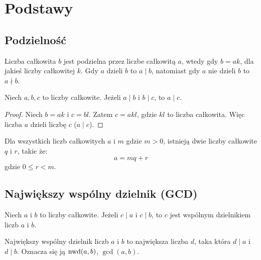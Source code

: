 
\chapter{Podstawy}
\setcounter{section}{-1}
\section{Podzielność}

\iffalse
\begin{definition}
  ~ %
  \begin{itemize}
    \item Liczba całkowita $n$ jest parzysta jeżeli $n = 2k$ dla jakiegoś $k$
    \item Liczba całkowita $n$ jest nieparzysta jeżeli $n = 2k + 1$ dla jakiegoś $k$
  \end{itemize}
\end{definition}
\fi

\begin{definition}
  Liczba całkowita $b$ jest podzielna przez liczbe całkowitą $a$,
  wtedy gdy $b = ak$, dla jakieś liczby całkowitej $k$.
  Gdy $a$ dzieli $b$ to $a \mid b$,
  natomiast gdy $a$ nie dzieli $b$ to $a \nmid b$.
\end{definition}

\begin{theorem}
  Niech $a, b, c$ to liczby całkowite. Jeżeli $a \mid b$ i $b \mid c$, to $a \mid c$.
\end{theorem}

\begin{proof}
  Niech $b = ak$ i $c = bl$.
  Zatem $c = akl$, gdzie $kl$ to liczba całkowita.
  Więc liczba $a$ dzieli liczbę $c$ ($a \mid c$).
\end{proof}

\begin{theorem}
  Dla wszystkich liczb całkowitych $a$ i $m$ gdzie $m > 0$,
  istnieją dwie liczby całkowite $q$ i $r$, takie że:
  \[
    a = mq + r
  \]
  gdzie $0 \leq r < m$.
\end{theorem}

\section{Największy wspólny dzielnik (GCD)}

\begin{definition}
  Niech $a$ i $b$ to liczby całkowite.
  Jeżeli $c \mid a$ i $c \mid b$,
  to $c$ jest wspólnym dzielnikiem liczb $a$ i $b$.

  Największy wspólny dzielnik
  liczb $a$ i $b$ to największa liczba $d$,
  taka która $d \mid a$ i $d \mid b$.
  Oznacza się ją $\operatorname{nwd}(a, b)$, $\gcd(a, b)$.
\end{definition}

